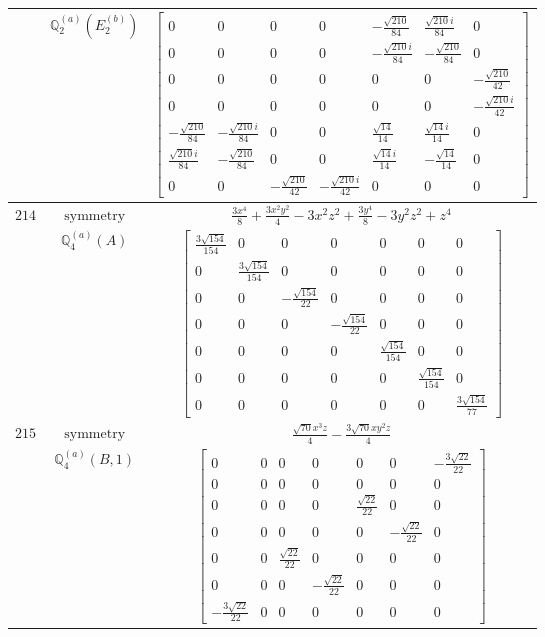 \documentclass[fleqn,8pt,landscape]{jsarticle}
\begin{document}
\begin{longtable}{ccc}
$  $ & $ \mathbb{Q}_{2}^{(a)}(E_{2}^{(b)}) $ & $ \begin{bmatrix} 0 & 0 & 0 & 0 & - \frac{\sqrt{210}}{84} & \frac{\sqrt{210} i}{84} & 0 \\ 0 & 0 & 0 & 0 & - \frac{\sqrt{210} i}{84} & - \frac{\sqrt{210}}{84} & 0 \\ 0 & 0 & 0 & 0 & 0 & 0 & - \frac{\sqrt{210}}{42} \\ 0 & 0 & 0 & 0 & 0 & 0 & - \frac{\sqrt{210} i}{42} \\ - \frac{\sqrt{210}}{84} & - \frac{\sqrt{210} i}{84} & 0 & 0 & \frac{\sqrt{14}}{14} & \frac{\sqrt{14} i}{14} & 0 \\ \frac{\sqrt{210} i}{84} & - \frac{\sqrt{210}}{84} & 0 & 0 & \frac{\sqrt{14} i}{14} & - \frac{\sqrt{14}}{14} & 0 \\ 0 & 0 & - \frac{\sqrt{210}}{42} & - \frac{\sqrt{210} i}{42} & 0 & 0 & 0 \end{bmatrix} $ \\ \hline
$ 214 $ & $ \text{symmetry} $ & $ \frac{3 x^{4}}{8} + \frac{3 x^{2} y^{2}}{4} - 3 x^{2} z^{2} + \frac{3 y^{4}}{8} - 3 y^{2} z^{2} + z^{4} $ \\
$  $ & $ \mathbb{Q}_{4}^{(a)}(A) $ & $ \begin{bmatrix} \frac{3 \sqrt{154}}{154} & 0 & 0 & 0 & 0 & 0 & 0 \\ 0 & \frac{3 \sqrt{154}}{154} & 0 & 0 & 0 & 0 & 0 \\ 0 & 0 & - \frac{\sqrt{154}}{22} & 0 & 0 & 0 & 0 \\ 0 & 0 & 0 & - \frac{\sqrt{154}}{22} & 0 & 0 & 0 \\ 0 & 0 & 0 & 0 & \frac{\sqrt{154}}{154} & 0 & 0 \\ 0 & 0 & 0 & 0 & 0 & \frac{\sqrt{154}}{154} & 0 \\ 0 & 0 & 0 & 0 & 0 & 0 & \frac{3 \sqrt{154}}{77} \end{bmatrix} $ \\ \hline
$ 215 $ & $ \text{symmetry} $ & $ \frac{\sqrt{70} x^{3} z}{4} - \frac{3 \sqrt{70} x y^{2} z}{4} $ \\
$  $ & $ \mathbb{Q}_{4}^{(a)}(B,1) $ & $ \begin{bmatrix} 0 & 0 & 0 & 0 & 0 & 0 & - \frac{3 \sqrt{22}}{22} \\ 0 & 0 & 0 & 0 & 0 & 0 & 0 \\ 0 & 0 & 0 & 0 & \frac{\sqrt{22}}{22} & 0 & 0 \\ 0 & 0 & 0 & 0 & 0 & - \frac{\sqrt{22}}{22} & 0 \\ 0 & 0 & \frac{\sqrt{22}}{22} & 0 & 0 & 0 & 0 \\ 0 & 0 & 0 & - \frac{\sqrt{22}}{22} & 0 & 0 & 0 \\ - \frac{3 \sqrt{22}}{22} & 0 & 0 & 0 & 0 & 0 & 0 \end{bmatrix} $ \\ \hline

\end{longtable}
\end{document}
